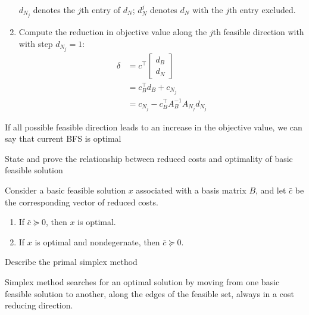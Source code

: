 \documentclass[11pt]{article}
\newcommand*{\xfield}[1]{\begin{mdframed}\centering #1\end{mdframed}\bigskip}
\newenvironment{field}{}{}
\newenvironment{note}{}{}
\begin{document}
\begin{note}
\begin{field}
\begin{enumerate}
      \(d_{N_j}\) denotes the \(j\)th entry of \(d_N\); \(d^j_N\)
      denotes \(d_N\) with the \(j\)th entry excluded.
    \item Compute the reduction in objective value along the \(j\)th
      feasible direction with with step \(d_{N_j} = 1\):
      \begin{align*}
        \delta & = c^\top \begin{bmatrix} d_B \\ d_N \end{bmatrix}\\
               & = c^\top_B d_B + c_{N_j} \\
               & = c_{N_j} - c^\top_B A_B^{-1} A_{N_j} d_{N_j}
      \end{align*}
    \end{enumerate}
    If all possible feasible direction leads to an increase in the
    objective value, we can say that current BFS is optimal
  \end{field}
\end{note}
%
\begin{note}
  \xfield{State and prove the relationship between reduced costs and
    optimality of basic feasible solution}
  \begin{field}
    Consider a basic feasible solution \(x\) associated with a basis
    matrix \(B\), and let \(\bar{c}\) be the corresponding vector of
    reduced costs.
    \begin{enumerate}
    \item If \(\bar{c} \succeq 0\), then \(x\) is optimal.
    \item If \(x\) is optimal and nondegernate, then \(\bar{c}
      \succeq 0\).
    \end{enumerate}
  \end{field}
\end{note}
%
\begin{note}
  \xfield{Describe the primal simplex method}
  \begin{field}
    Simplex method searches for an optimal solution by moving from one
    basic feasible solution to another, along the edges of the
    feasible set, always in a cost reducing direction.
  \end{field}
\end{note}
\end{document}
